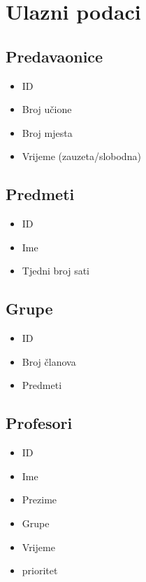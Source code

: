 \section{Ulazni podaci}
  \subsection{Predavaonice}
    \begin{itemize}
      \item ID
      \item Broj učione
      \item Broj mjesta
      \item Vrijeme (zauzeta/slobodna)
    \end{itemize}
  \subsection{Predmeti}
    \begin{itemize}
      \item ID
      \item Ime
      \item Tjedni broj sati
    \end{itemize}
  \subsection{Grupe}
    \begin{itemize}
      \item ID
      \item Broj članova
      \item Predmeti
    \end{itemize}
  \subsection{Profesori}
    \begin{itemize}
      \item ID
      \item Ime
      \item Prezime
      \item Grupe
      \item Vrijeme
      \item prioritet
    \end{itemize}
